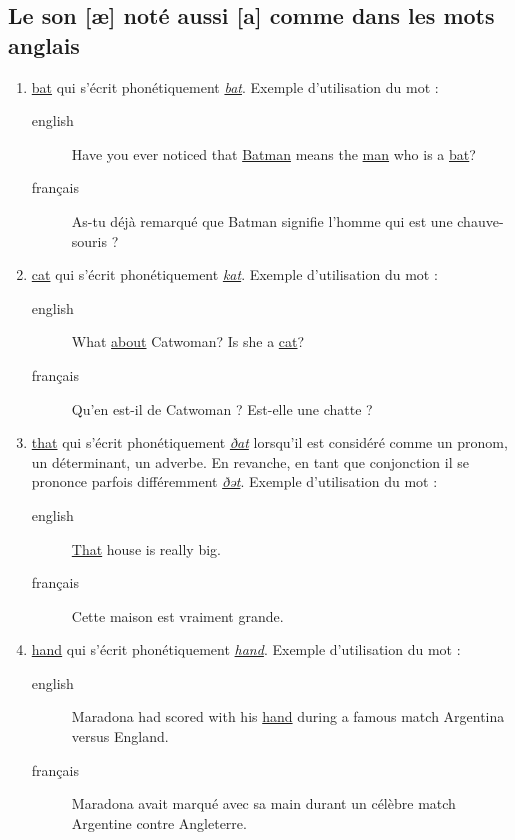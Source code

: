 \subsection{Le son [æ] noté aussi [a] comme dans les mots anglais}
\label{sec:orgb23ea7e}
\begin{enumerate}
\item \href{http://www.wordreference.com/enfr/bat}{bat} qui s'écrit phonétiquement \href{https://en.oxforddictionaries.com/definition/bat}{\emph{bat}}. Exemple d'utilisation du mot :
\begin{description}
\item[{english}] \textenglish{Have you ever noticed that \href{https://www.youtube.com/watch?v=O24Ui015YXM}{Batman} means the \href{https://youtu.be/24howVwYgHY}{man} who
is a \href{https://youtu.be/eozL5n2Plmc}{bat}?}
\item[{français}] As-tu déjà remarqué que Batman signifie l'homme qui
est une chauve-souris ?
\end{description}
\item \href{http://www.wordreference.com/enfr/cat}{cat} qui s'écrit phonétiquement \href{https://en.oxforddictionaries.com/definition/cat}{\emph{kat}}. Exemple d'utilisation du mot :
\begin{description}
\item[{english}] \textenglish{What \href{https://youtu.be/7FjChUY0zgQ}{about} Catwoman? Is she a \href{https://youtu.be/eNQazP-wdj4}{cat}?}
\item[{français}] Qu'en est-il de Catwoman ? Est-elle une chatte ?
\end{description}
\item \href{http://www.wordreference.com/enfr/that}{that} qui s'écrit phonétiquement \href{https://en.oxforddictionaries.com/definition/that}{\emph{ðat}} lorsqu'il est considéré comme
un pronom, un déterminant, un adverbe. En revanche, en tant que
conjonction il se prononce parfois différemment \href{https://en.oxforddictionaries.com/definition/that}{\emph{ðət}}. Exemple d'utilisation du mot :
\begin{description}
\item[{english}] \textenglish{\href{https://youtu.be/HAlz5TiKOCM}{That} house is really big.}
\item[{français}] Cette maison est vraiment grande.
\end{description}
\item \href{http://www.wordreference.com/enfr/hand}{hand} qui s'écrit phonétiquement \href{https://en.oxforddictionaries.com/definition/hand}{\emph{hand}}. Exemple d'utilisation du mot : 
\begin{description}
\item[{english}] \textenglish{Maradona had scored with his \href{https://youtu.be/KDKBY9FqwQg}{hand} during a famous
match Argentina versus England.}
\item[{français}] Maradona avait marqué avec sa main durant un célèbre
match Argentine contre Angleterre.
\end{description}
\end{enumerate}


